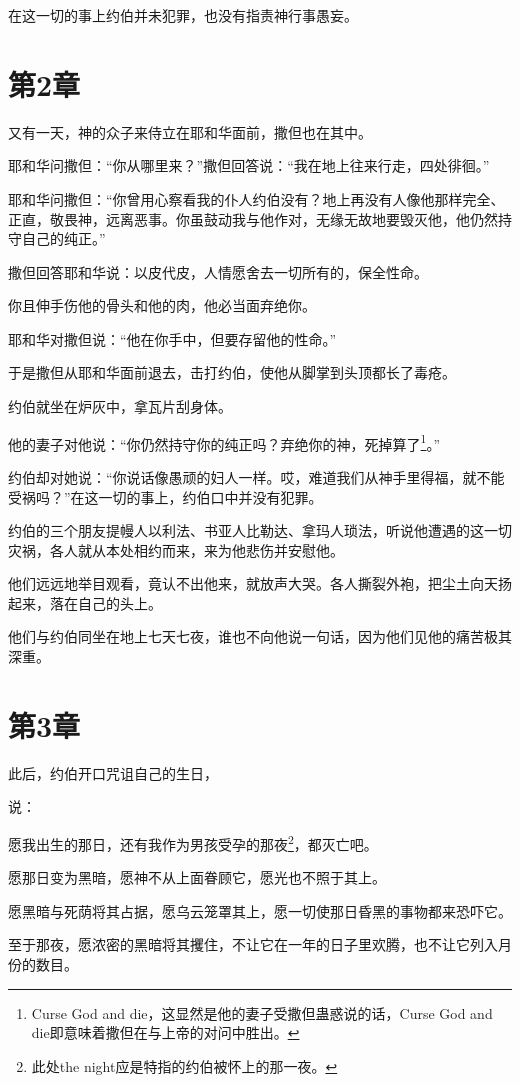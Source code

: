 \documentclass[12pt,oneside]{book}
\begin{document}
在这一切的事上约伯并未犯罪，也没有指责神行事愚妄。

\chapter{第2章}
又有一天，神的众子来侍立在耶和华面前，撒但也在其中。

耶和华问撒但：“你从哪里来？”撒但回答说：“我在地上往来行走，四处徘徊。”

耶和华问撒但：“你曾用心察看我的仆人约伯没有？地上再没有人像他那样完全、正直，敬畏神，远离恶事。你虽鼓动我与他作对，无缘无故地要毁灭他，他仍然持守自己的纯正。”

撒但回答耶和华说：以皮代皮，人情愿舍去一切所有的，保全性命。

你且伸手伤他的骨头和他的肉，他必当面弃绝你。

耶和华对撒但说：“他在你手中，但要存留他的性命。”

于是撒但从耶和华面前退去，击打约伯，使他从脚掌到头顶都长了毒疮。

约伯就坐在炉灰中，拿瓦片刮身体。

他的妻子对他说：“你仍然持守你的纯正吗？弃绝你的神，死掉算了\footnote{Curse God and die，这显然是他的妻子受撒但蛊惑说的话，Curse God and die即意味着撒但在与上帝的对问中胜出。}。”

约伯却对她说：“你说话像愚顽的妇人一样。哎，难道我们从神手里得福，就不能受祸吗？”在这一切的事上，约伯口中并没有犯罪。

约伯的三个朋友提幔人以利法、书亚人比勒达、拿玛人琐法，听说他遭遇的这一切灾祸，各人就从本处相约而来，来为他悲伤并安慰他。

他们远远地举目观看，竟认不出他来，就放声大哭。各人撕裂外袍，把尘土向天扬起来，落在自己的头上。

他们与约伯同坐在地上七天七夜，谁也不向他说一句话，因为他们见他的痛苦极其深重。


\chapter{第3章}
此后，约伯开口咒诅自己的生日，

说：

愿我出生的那日，还有我作为男孩受孕的那夜\footnote{此处the night应是特指的约伯被怀上的那一夜。}，都灭亡吧。

愿那日变为黑暗，愿神不从上面眷顾它，愿光也不照于其上。

愿黑暗与死荫将其占据，愿乌云笼罩其上，愿一切使那日昏黑的事物都来恐吓它。

至于那夜，愿浓密的黑暗将其攫住，不让它在一年的日子里欢腾，也不让它列入月份的数目。
\end{document}
